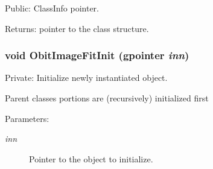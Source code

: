 Public: Class\-Info pointer. 

\begin{Desc}
\item[Returns:]pointer to the class structure. \end{Desc}
\subsubsection{\setlength{\rightskip}{0pt plus 5cm}void Obit\-Image\-Fit\-Init (gpointer {\em inn})}\label{ObitImageFit_8c_a3}


Private: Initialize newly instantiated object. 

Parent classes portions are (recursively) initialized first \begin{Desc}
\item[Parameters:]
\begin{description}
\item[{\em inn}]Pointer to the object to initialize. \end{description}
\end{Desc}
